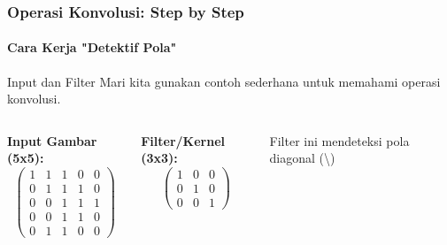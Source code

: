 \documentclass[t,aspectratio=169,xcolor=dvipsnames]{beamer}
\begin{document}
\begin{frame}
    \frametitle{Operasi Konvolusi: Step by Step}
    \framesubtitle{Cara Kerja "Detektif Pola"}
    \footnotesize

    \begin{block}{Input dan Filter}
        Mari kita gunakan contoh sederhana untuk memahami operasi konvolusi.
    \end{block}

    \begin{columns}[t]
        \textbf{Input Gambar (5x5):}
        $$
        \begin{pmatrix}
        1 & 1 & 1 & 0 & 0 \\
        0 & 1 & 1 & 1 & 0 \\
        0 & 0 & 1 & 1 & 1 \\
        0 & 0 & 1 & 1 & 0 \\
        0 & 1 & 1 & 0 & 0
        \end{pmatrix}
        $$

        \textbf{Filter/Kernel (3x3):}
        $$
        \begin{pmatrix}
        1 & 0 & 0 \\
        0 & 1 & 0 \\
        0 & 0 & 1
        \end{pmatrix}
        $$
        
        \vspace{0.3cm}
        Filter ini mendeteksi pola diagonal (\textbackslash)
    \end{columns}

\end{frame}
\end{document}
